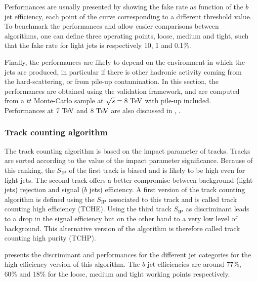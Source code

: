     Performances are usually presented by showing the fake rate as function
    of the $b$ jet efficiency, each point of the curve corresponding to a different threshold
    value. To benchmark the performances and allow easier comparisons
    between algorithms, one can define three operating points, loose, medium and tight,
    such that the fake rate for light jets is respectively 10, 1 and 0.1\%.

    Finally, the performances are likely to depend on the environment in which
    the jets are produced, in particular if there is other hadronic activity coming from
    the hard-scattering, or from pile-up contamination. In this section, the performances
    are obtained using the validation framework, and are computed from a $t\bar{t}$
    Monte-Carlo sample at $\sqrt{s} = 8~\text{TeV}$ with pile-up included. Performances at $7~\text{TeV}$
    and $8~\text{TeV}$ are also discussed in \cite{BTagging7TeV}, \cite{BTagging8TeV}.

        \subsubsection{Track counting algorithm}

    The track counting algorithm is based on the impact parameter of tracks. Tracks are
    sorted according to the value of the impact parameter significance. Because of this
    ranking, the $S_\text{IP}$ of the first track is biased and is likely to be high even
    for light jets. The second track offers a better compromise between background (light
    jets) rejection and signal ($b$ jets) efficiency. A first version of the track counting 
    algorithm is defined using the $S_\text{IP}$ associated to this track and is called track 
    counting high efficiency (TCHE). Using the third track $S_\text{IP}$ as discriminant 
    leads to a drop in the signal efficiency but on the other hand to a very low level of 
    background. This alternative version of the algorithm is therefore called track counting high 
    purity (TCHP).

     presents the discriminant and
    performances for the different jet categories for the high efficiency version of this
    algorithm. The $b$ jet efficiencies are around 77\%, 60\% and 18\% for the loose, medium
    and tight working points respectively.

